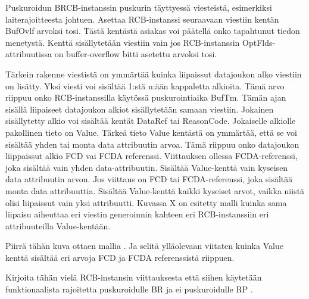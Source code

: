 Puskuroidun BRCB-instanssin puskurin täyttyessä viesteistä, esimerkiksi laiterajoitteesta johtuen. Asettaa RCB-instanssi seuraavaan viestiin kentän BufOvlf arvoksi tosi. Tästä kentästä asiakas voi päätellä onko tapahtunut tiedon menetystä. Kenttä sisällytetään viestiin vain jos RCB-instanssin OptFlds-attribuutissa on buffer-overflow bitti asetettu arvoksi tosi. \cite[s.~106--107]{IEC61850-7-2}

Tärkein rakenne viestistä on ymmärtää kuinka liipaissut datajoukon alko viestiin on lisätty. Yksi viesti voi sisältää 1:stä n:ään kappaletta alkioita. Tämä arvo riippuu onko RCB-instanssilla käytössä puskurointiaika BufTm. Tämän ajan sisällä liipaiseet datajoukon alkiot sisällytetään samaan viestiin. Jokainen sisällytetty alkio voi sisältää kentät DataRef tai ReasonCode. Jokaiselle alkiolle pakollinen tieto on Value. Tärkeä tieto Value kentästä on ymmärtää, että se voi sisältää yhden tai monta data attribuutin arvoa. Tämä riippuu onko datajoukon liippaissut alkio FCD vai FCDA referenssi. Viittauksen ollessa FCDA-referenssi, joka sisältää vain yhden data-attribuutin. Sisältää Value-kenttä vain kyseisen data attribuutin arvon. Jos viittaus on FCD tai FCDA-referenssi, joka sisältää monta data attribuuttia. Sisältää Value-kenttä kaikki kyseiset arvot, vaikka niistä olisi liipaissut vain yksi attribuutti. Kuvassa X on esitetty malli kuinka sama liipaisu aiheuttaa eri viestin generoinnin kahteen eri RCB-instanssiin eri attribuuteilla Value-kentään. \cite[s.~107--108]{IEC61850-7-1}

\begin{it}
	Piirrä tähän kuva ottaen mallia \cite[s.~108]{IEC61850-7-2}. Ja selitä ylläolevaan viitaten kuinka Value kenttä sisältää eri arvoja FCD ja FCDA referenssistä riippuen.

	Kirjoita tähän vielä RCB-instansin viittauksesta että siihen käytetään funktionaalista rajoitetta puskuroidulle BR ja ei puskuroidulle RP \cite[s.~75]{IEC61850-8-1}.
\end{it}

